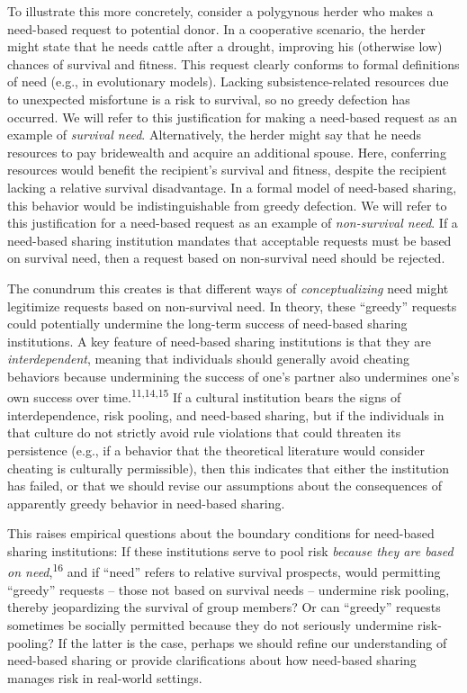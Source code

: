 \documentclass[
]{article}
\begin{document}
To illustrate this more concretely, consider a polygynous herder who makes a need-based request to potential donor. In a cooperative scenario, the herder might state that he needs cattle after a drought, improving his (otherwise low) chances of survival and fitness. This request clearly conforms to formal definitions of need (e.g., in evolutionary models). Lacking subsistence-related resources due to unexpected misfortune is a risk to survival, so no greedy defection has occurred. We will refer to this justification for making a need-based request as an example of \emph{survival need}. Alternatively, the herder might say that he needs resources to pay bridewealth and acquire an additional spouse. Here, conferring resources would benefit the recipient's survival and fitness, despite the recipient lacking a relative survival disadvantage. In a formal model of need-based sharing, this behavior would be indistinguishable from greedy defection. We will refer to this justification for a need-based request as an example of \emph{non-survival need}. If a need-based sharing institution mandates that acceptable requests must be based on survival need, then a request based on non-survival need should be rejected.

The conundrum this creates is that different ways of \emph{conceptualizing} need might legitimize requests based on non-survival need. In theory, these ``greedy'' requests could potentially undermine the long-term success of need-based sharing institutions. A key feature of need-based sharing institutions is that they are \emph{interdependent}, meaning that individuals should generally avoid cheating behaviors because undermining the success of one's partner also undermines one's own success over time.\textsuperscript{11,14,15} If a cultural institution bears the signs of interdependence, risk pooling, and need-based sharing, but if the individuals in that culture do not strictly avoid rule violations that could threaten its persistence (e.g., if a behavior that the theoretical literature would consider cheating is culturally permissible), then this indicates that either the institution has failed, or that we should revise our assumptions about the consequences of apparently greedy behavior in need-based sharing.

This raises empirical questions about the boundary conditions for need-based sharing institutions: If these institutions serve to pool risk \emph{because they are based on need},\textsuperscript{16} and if ``need'' refers to relative survival prospects, would permitting ``greedy'' requests -- those not based on survival needs -- undermine risk pooling, thereby jeopardizing the survival of group members? Or can ``greedy'' requests sometimes be socially permitted because they do not seriously undermine risk-pooling? If the latter is the case, perhaps we should refine our understanding of need-based sharing or provide clarifications about how need-based sharing manages risk in real-world settings.
\end{document}
